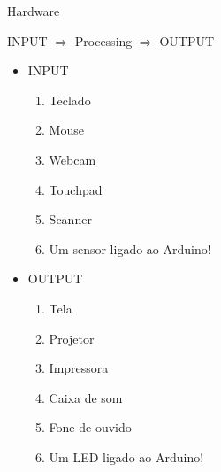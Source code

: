 {\huge Hardware}

\begin{center}
	{\LARGE INPUT $\Rightarrow$ Processing $\Rightarrow$ OUTPUT}
	
	\begin{itemize}
		\item INPUT
		\begin{enumerate}
			\item Teclado
			\item Mouse
			\item Webcam
			\item Touchpad
			\item Scanner
			\item Um sensor ligado ao Arduino!
		\end{enumerate}
	
	\item OUTPUT
	\begin{enumerate}
		\item Tela
		\item Projetor
		\item Impressora
		\item Caixa de som
		\item Fone de ouvido
		\item Um LED ligado ao Arduino!
	\end{enumerate}
	\end{itemize}
\end{center}

\vfill\null\columnbreak


